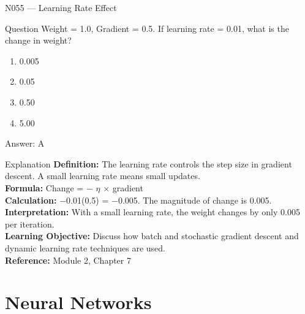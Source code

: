 \documentclass[aspectratio=169,8pt]{beamer}
\begin{document}
	\begin{frame}{N055 --- Learning Rate Effect}
		\begin{block}{Question}
			Weight = 1.0, Gradient = 0.5. If learning rate = 0.01, what is the change in weight?
			\begin{enumerate}
				\item 0.005
				\item 0.05
				\item 0.50
				\item 5.00
			\end{enumerate}
		\end{block}
		\begin{exampleblock}{Answer: A}\end{exampleblock}
		\begin{block}{Explanation}
			\textbf{Definition:} The learning rate controls the step size in gradient descent. A small learning rate means small updates.\\
			\textbf{Formula:} Change = $-$ $\eta$ $\times$ gradient\\
			\textbf{Calculation:} $-$0.01(0.5) = $-$0.005. The magnitude of change is 0.005.\\
			\textbf{Interpretation:} With a small learning rate, the weight changes by only 0.005 per iteration.\\
			\textbf{Learning Objective:} Discuss how batch and stochastic gradient descent and dynamic learning rate techniques are used.\\
			\textbf{Reference:} Module 2, Chapter 7
		\end{block}
	\end{frame}
	
	\section{Neural Networks}
	
\end{document}
